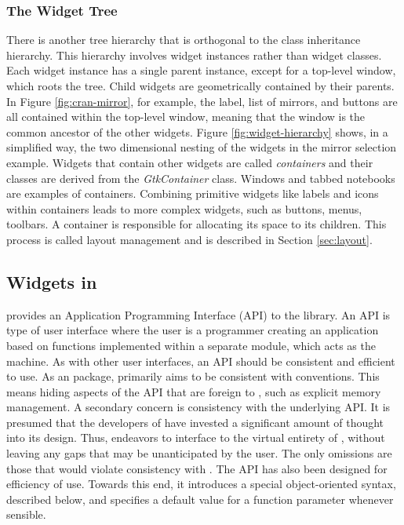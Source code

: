 \documentclass[article]{jss}
\begin{document}
\subsubsection{The Widget Tree}

There is another tree hierarchy that is orthogonal to the 
class inheritance hierarchy. This hierarchy involves widget instances rather
than widget classes. Each widget instance has a single parent instance, except
for a top-level window, which roots the tree. Child widgets are geometrically
contained by their parents. In Figure \ref{fig:cran-mirror}, 
for example, the label, list of mirrors, and buttons are all contained within the 
top-level window, meaning that the window is the common ancestor of the other widgets.
Figure \ref{fig:widget-hierarchy} shows, in a simplified way, the two dimensional
nesting of the widgets in the mirror selection example. Widgets that contain 
other widgets are called \emph{containers} and their classes are derived from 
the \emph{GtkContainer} class. Windows and tabbed notebooks are examples of containers.
Combining primitive widgets like labels and icons within containers
leads to more complex widgets, such as buttons, menus, toolbars. A container is 
responsible for allocating its space to its children. This process is called
layout management and is described in Section \ref{sec:layout}.

\subsection[GTK+ Widgets in R]{ Widgets in }

 provides an Application Programming Interface (API) to the  
library. An API is type of user interface where the user
is a programmer creating an application based on functions implemented within a 
separate module, which acts as the machine. As with other user interfaces,
an API should be consistent and efficient to use. As an  package,
 primarily aims to be consistent with  conventions. This
means hiding aspects of the  API that are foreign to ,
such as explicit memory management. A secondary concern is consistency 
with the underlying  API. It is presumed that the developers of
 have invested a significant amount of thought into its design. Thus,
 endeavors to interface  to the virtual entirety of ,
without leaving any gaps that may be unanticipated by the user. 
The only omissions are those that would violate consistency with .
The  API has also been designed for efficiency of use. Towards this end,
it introduces a special object-oriented syntax, described below, and specifies
a default value for a function parameter whenever sensible.
\end{document}
